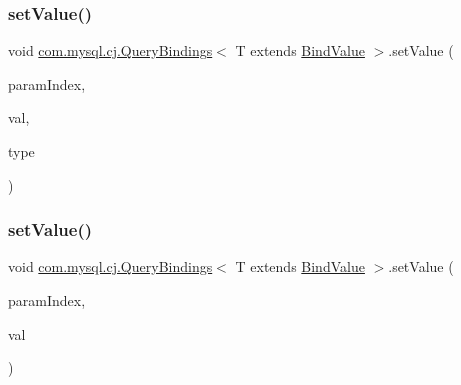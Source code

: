 \subsubsection{\texorpdfstring{set\+Value()}{setValue()}\hspace{0.1cm}{\footnotesize\ttfamily [2/4]}}
{\footnotesize\ttfamily void \mbox{\hyperlink{interfacecom_1_1mysql_1_1cj_1_1_query_bindings}{com.\+mysql.\+cj.\+Query\+Bindings}}$<$ T extends \mbox{\hyperlink{interfacecom_1_1mysql_1_1cj_1_1_bind_value}{Bind\+Value}} $>$.set\+Value (\begin{DoxyParamCaption}\item[{int}]{param\+Index,  }\item[{byte \mbox{[}$\,$\mbox{]}}]{val,  }\item[{\mbox{\hyperlink{enumcom_1_1mysql_1_1cj_1_1_mysql_type}{Mysql\+Type}}}]{type }\end{DoxyParamCaption})}

\mbox{\label{interfacecom_1_1mysql_1_1cj_1_1_query_bindings_a93f1da1730b58d69e972b299539ae66c}} 
\subsubsection{\texorpdfstring{set\+Value()}{setValue()}\hspace{0.1cm}{\footnotesize\ttfamily [3/4]}}
{\footnotesize\ttfamily void \mbox{\hyperlink{interfacecom_1_1mysql_1_1cj_1_1_query_bindings}{com.\+mysql.\+cj.\+Query\+Bindings}}$<$ T extends \mbox{\hyperlink{interfacecom_1_1mysql_1_1cj_1_1_bind_value}{Bind\+Value}} $>$.set\+Value (\begin{DoxyParamCaption}\item[{int}]{param\+Index,  }\item[{String}]{val }\end{DoxyParamCaption})}

\mbox{\label{interfacecom_1_1mysql_1_1cj_1_1_query_bindings_ae4de974420b8a30d10203dcd8e7bb5a7}} 
